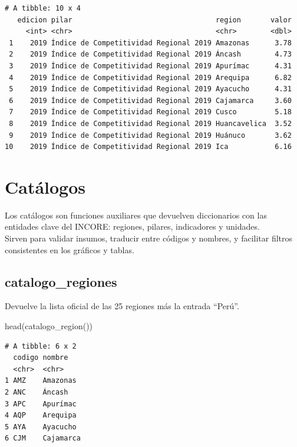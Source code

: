 \documentclass[
  11pt,
  letterpaper,
  DIV=11,
  numbers=noendperiod]{scrartcl}
\newenvironment{Shaded}{\begin{snugshade}}{\end{snugshade}}
\newcommand{\FunctionTok}[1]{\textcolor[rgb]{0.28,0.35,0.67}{#1}}
\newcommand{\NormalTok}[1]{\textcolor[rgb]{0.00,0.23,0.31}{#1}}
\begin{document}
\begin{verbatim}
# A tibble: 10 x 4
   edicion pilar                                  region       valor
     <int> <chr>                                  <chr>        <dbl>
 1    2019 Índice de Competitividad Regional 2019 Amazonas      3.78
 2    2019 Índice de Competitividad Regional 2019 Áncash        4.73
 3    2019 Índice de Competitividad Regional 2019 Apurímac      4.31
 4    2019 Índice de Competitividad Regional 2019 Arequipa      6.82
 5    2019 Índice de Competitividad Regional 2019 Ayacucho      4.31
 6    2019 Índice de Competitividad Regional 2019 Cajamarca     3.60
 7    2019 Índice de Competitividad Regional 2019 Cusco         5.18
 8    2019 Índice de Competitividad Regional 2019 Huancavelica  3.52
 9    2019 Índice de Competitividad Regional 2019 Huánuco       3.62
10    2019 Índice de Competitividad Regional 2019 Ica           6.16
\end{verbatim}

\section{Catálogos}\label{catuxe1logos}

Los catálogos son funciones auxiliares que devuelven diccionarios con
las entidades clave del INCORE: regiones, pilares, indicadores y
unidades.\\
Sirven para validar insumos, traducir entre códigos y nombres, y
facilitar filtros consistentes en los gráficos y tablas.

\subsection{catalogo\_regiones}\label{catalogo_regiones}

Devuelve la lista oficial de las 25 regiones más la entrada ``Perú''.

\begin{Shaded}
\begin{Highlighting}[]
\FunctionTok{head}\NormalTok{(}\FunctionTok{catalogo\_region}\NormalTok{())}
\end{Highlighting}
\end{Shaded}

\begin{verbatim}
# A tibble: 6 x 2
  codigo nombre   
  <chr>  <chr>    
1 AMZ    Amazonas 
2 ANC    Áncash   
3 APC    Apurímac 
4 AQP    Arequipa 
5 AYA    Ayacucho 
6 CJM    Cajamarca
\end{verbatim}
\end{document}
